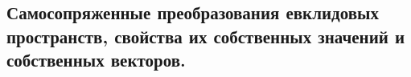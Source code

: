 \subsection{Самосопряженные преобразования евклидовых пространств, свойства их собственных значений и собственных векторов.}
